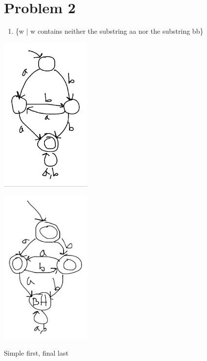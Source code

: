 \documentclass[letterpaper, 12pt]{article}
\begin{document}
\section{Problem 2}
\label{sec:orgfb43a52}
\begin{enumerate}
\item \{w | w contains neither the substring aa nor the substring bb\}
\end{enumerate}
\begin{center}
\includegraphics[width=4.5cm]{hw2/simple2-1.png}
\end{center}
\begin{center}
\includegraphics[width=4.5cm]{hw2/2-1.png}
\end{center}
Simple first, final last
\end{document}
